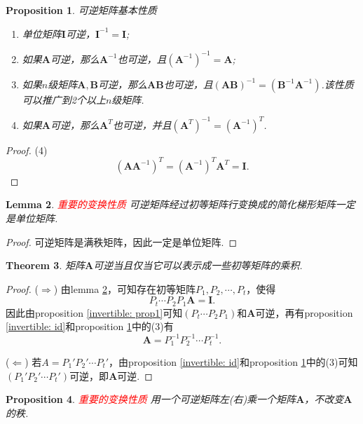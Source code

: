 \documentclass{article}
\newtheorem{theorem}{Theorem}[section]
\newtheorem{lemma}[theorem]{Lemma}
\newtheorem{proposition}[theorem]{Proposition}
\newcommand{\mbf}[1]{\bm{#1}}
\newcommand{\redt}[1]{\textcolor{red}{#1}}
\begin{document}
\begin{proposition}\label{invertible: basic}
\rm 可逆矩阵基本性质
\begin{enumerate}
	\item 单位矩阵$\mbf{I}$可逆，$\mbf{I}^{-1} = \mbf{I}$;
	\item 如果$\mbf{A}$可逆，那么$\mbf{A}^{-1}$也可逆，且$(\mbf{A}^{-1})^{-1} = \mbf{A}$;
	\item 如果$n$级矩阵$\mbf{A},\mbf{B}$可逆，那么$\mbf{A}\mbf{B}$也可逆，且$(\mbf{A}\mbf{B})^{-1} = (\mbf{B}^{-1}\mbf{A}^{-1})$.该性质可以推广到2个以上$n$级矩阵. 
	\item 如果$\mbf{A}$可逆，那么$\mbf{A}^{T}$也可逆，并且$(\mbf{A}^T)^{-1} = (\mbf{A}^{-1})^T$.
\end{enumerate}
\end{proposition}

\begin{proof}
\rm (4) 
$$
(\mbf{A}\mbf{A}^{-1})^{T} = (\mbf{A}^{-1})^T\mbf{A}^{T} = \mbf{I}. 
$$
\end{proof}

\begin{lemma}\label{invertible: 2id}
\rm \redt{重要的变换性质} 可逆矩阵经过初等矩阵行变换成的简化梯形矩阵一定是单位矩阵.
\end{lemma}

\begin{proof}
可逆矩阵是满秩矩阵，因此一定是单位矩阵.
\end{proof}

\begin{theorem}\label{invertible: decompose}
\rm 矩阵$\mbf{A}$可逆当且仅当它可以表示成一些初等矩阵的乘积.
\end{theorem}

\begin{proof}
($\Rightarrow$) 由lemma \ref{invertible: 2id}，可知存在初等矩阵$P_1,P_2,\cdots,P_t$，使得
$$
P_t\cdots P_2P_1\mbf{A} = \mbf{I}.
$$
因此由proposition \ref{invertible: prop1}可知$(P_t\cdots P_2P_1)$和$\mbf{A}$可逆，再有proposition \ref{invertible: id}和proposition \ref{invertible: basic}中的(3)有
$$
\mbf{A} = P_1^{-1}P_2^{-1}\cdots P_t^{-1}.
$$

($\Leftarrow$) 若$A = P_1'P_2'\cdots P_t'$，由proposition \ref{invertible: id}和proposition \ref{invertible: basic}中的(3)可知$(P_1'P_2'\cdots P_t')$可逆，即$\mbf{A}$可逆.
\end{proof}

\begin{proposition}\label{invertible: mul-rank-no-change}
\rm \redt{重要的变换性质} 用一个可逆矩阵左(右)乘一个矩阵$\mbf{A}$，不改变$\mbf{A}$的秩.
\end{proposition}
\end{document}
